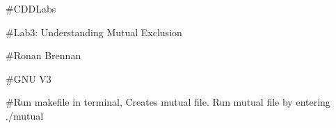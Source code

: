 \#\+C\+D\+D\+Labs

\#\+Lab3\+: Understanding Mutual Exclusion

\#\+Ronan Brennan

\#\+G\+NU V3

\#\+Run makefile in terminal, Creates mutual file. Run mutual file by entering ./mutual 
